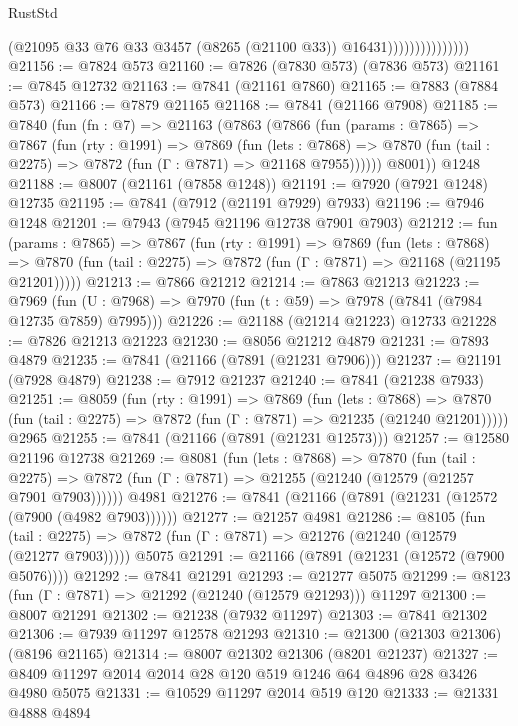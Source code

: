 \begin{lexlean}{RustStd}
\begin{coremodule}
                                (@21095 @33 @76 @33 @3457 (@8265 (@21100 @33)) @16431)))))))))))))))
@21156 := @7824 @573
@21160 := @7826 (@7830 @573) (@7836 @573)
@21161 := @7845 @12732
@21163 := @7841 (@21161 @7860)
@21165 := @7883 (@7884 @573)
@21166 := @7879 @21165
@21168 := @7841 (@21166 @7908)
@21185 := @7840
    (fun (fn : @7) =>
    @21163
      (@7863
        (@7866
          (fun (params : @7865) =>
          @7867
            (fun (rty : @1991) =>
            @7869
              (fun (lets : @7868) =>
              @7870 (fun (tail : @2275) => @7872 (fun (Γ : @7871) => @21168 @7955))))))
        @8001))
    @1248
@21188 := @8007 (@21161 (@7858 @1248))
@21191 := @7920 (@7921 @1248) @12735
@21195 := @7841 (@7912 (@21191 @7929) @7933)
@21196 := @7946 @1248
@21201 := @7943 (@7945 @21196 @12738 @7901 @7903)
@21212 := fun (params : @7865) =>
  @7867
    (fun (rty : @1991) =>
    @7869
      (fun (lets : @7868) =>
      @7870 (fun (tail : @2275) => @7872 (fun (Γ : @7871) => @21168 (@21195 @21201)))))
@21213 := @7866 @21212
@21214 := @7863 @21213
@21223 := @7969
    (fun (U : @7968) => @7970 (fun (t : @59) => @7978 (@7841 (@7984 @12735 @7859) @7995)))
@21226 := @21188 (@21214 @21223) @12733
@21228 := @7826 @21213 @21223
@21230 := @8056 @21212 @4879
@21231 := @7893 @4879
@21235 := @7841 (@21166 (@7891 (@21231 @7906)))
@21237 := @21191 (@7928 @4879)
@21238 := @7912 @21237
@21240 := @7841 (@21238 @7933)
@21251 := @8059
    (fun (rty : @1991) =>
    @7869
      (fun (lets : @7868) =>
      @7870 (fun (tail : @2275) => @7872 (fun (Γ : @7871) => @21235 (@21240 @21201)))))
    @2965
@21255 := @7841 (@21166 (@7891 (@21231 @12573)))
@21257 := @12580 @21196 @12738
@21269 := @8081
    (fun (lets : @7868) =>
    @7870
      (fun (tail : @2275) =>
      @7872 (fun (Γ : @7871) => @21255 (@21240 (@12579 (@21257 @7901 @7903))))))
    @4981
@21276 := @7841 (@21166 (@7891 (@21231 (@12572 (@7900 (@4982 @7903))))))
@21277 := @21257 @4981
@21286 := @8105
    (fun (tail : @2275) => @7872 (fun (Γ : @7871) => @21276 (@21240 (@12579 (@21277 @7903)))))
    @5075
@21291 := @21166 (@7891 (@21231 (@12572 (@7900 @5076))))
@21292 := @7841 @21291
@21293 := @21277 @5075
@21299 := @8123 (fun (Γ : @7871) => @21292 (@21240 (@12579 @21293))) @11297
@21300 := @8007 @21291
@21302 := @21238 (@7932 @11297)
@21303 := @7841 @21302
@21306 := @7939 @11297 @12578 @21293
@21310 := @21300 (@21303 @21306) (@8196 @21165)
@21314 := @8007 @21302 @21306 (@8201 @21237)
@21327 := @8409 @11297 @2014 @2014 @28 @120 @519 @1246 @64 @4896 @28 @3426 @4980 @5075
@21331 := @10529 @11297 @2014 @519 @120
@21333 := @21331 @4888 @4894

\end{coremodule}
\end{lexlean}
